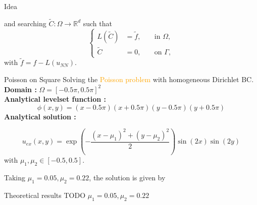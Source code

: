 \begin{frame}{Idea}
	\vspace{-8pt}
	\begin{minipage}{\linewidth}
		and searching $\tilde{C}: \Omega \rightarrow \mathbb{R}^d$ such that
		\begin{equation*}
			\left\{\begin{aligned}
				L(\tilde{C})&=\tilde{f}, \; &&\text{in } \Omega, \\
				\tilde{C}&=0, \; &&\text{on } \Gamma,
			\end{aligned}\right. %
		\end{equation*}
		with $\tilde{f}=f-L(u_{NN})$. 
	\end{minipage}
\end{frame}

\begin{frame}{Poisson on Square}
	Solving the \textcolor{orange}{Poisson problem} with homogeneous Dirichlet BC. \\
	 \textbf{Domain :} $\Omega=[−0.5\pi,0.5\pi]^2$ \\
	 \textbf{Analytical levelset function :}
	\small
	\begin{equation*}
		\phi(x,y)=(x-0.5\pi)(x+0.5\pi)(y-0.5\pi)(y+0.5\pi)
	\end{equation*} 
	 \textbf{Analytical solution :}
	\small
	
	\vspace{-8pt}
	\begin{equation*}
		u_{ex}(x,y)=\exp\left(−\frac{(x-\mu_1)^2+(y-\mu_2)^2}{2}\right)\sin(2x)\sin(2y)
	\end{equation*} 
	\normalsize
	with $\mu_1,\mu_2\in[-0.5,0.5]$. 
	
	\vspace{8pt}
	Taking $\mu_1=0.05,\mu_2=0.22$, the solution is given by
	\begin{minipage}{0.68\linewidth}
		\centering
	\end{minipage}
	\begin{minipage}{0.28\linewidth}
		\flushright
	\end{minipage}
\end{frame}

\begin{frame}{Theoretical results}
	TODO
	$\mu_1=0.05,\mu_2=0.22$
	\begin{center}
	\end{center}
\end{frame}


